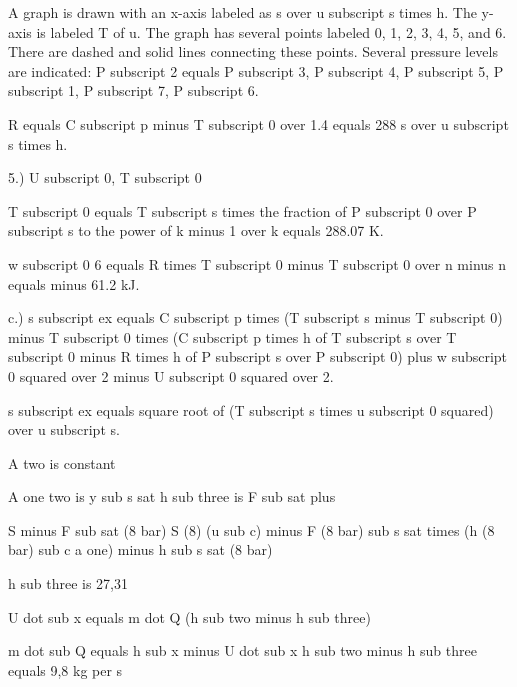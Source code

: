 A graph is drawn with an x-axis labeled as s over u subscript s times h. The y-axis is labeled T of u. The graph has several points labeled 0, 1, 2, 3, 4, 5, and 6. There are dashed and solid lines connecting these points. Several pressure levels are indicated: P subscript 2 equals P subscript 3, P subscript 4, P subscript 5, P subscript 1, P subscript 7, P subscript 6.

R equals C subscript p minus T subscript 0 over 1.4 equals 288 s over u subscript s times h.

5.) U subscript 0, T subscript 0

T subscript 0 equals T subscript s times the fraction of P subscript 0 over P subscript s to the power of k minus 1 over k equals 288.07 K.

w subscript 0 6 equals R times T subscript 0 minus T subscript 0 over n minus n equals minus 61.2 kJ.

c.) s subscript ex equals C subscript p times (T subscript s minus T subscript 0) minus T subscript 0 times (C subscript p times h of T subscript s over T subscript 0 minus R times h of P subscript s over P subscript 0) plus w subscript 0 squared over 2 minus U subscript 0 squared over 2.

s subscript ex equals square root of (T subscript s times u subscript 0 squared) over u subscript s.

A two is constant

A one two is y sub s sat
h sub three is F sub sat plus

S minus F sub sat (8 bar)
S (8) (u sub c) minus F (8 bar) sub s sat
times (h (8 bar) sub c a one) minus h sub s sat (8 bar)

h sub three is 27,31

U dot sub x equals m dot Q (h sub two minus h sub three)

m dot sub Q equals h sub x minus U dot sub x
h sub two minus h sub three
equals 9,8 kg per s